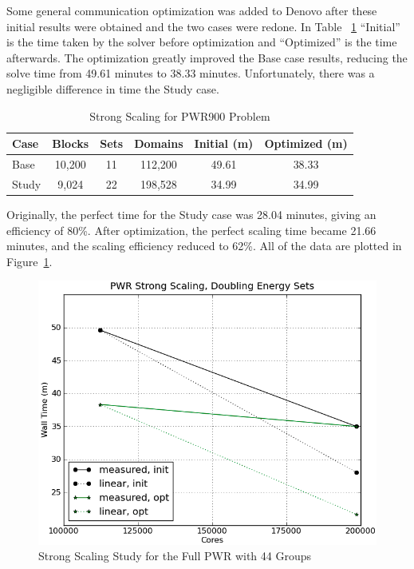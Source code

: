 Some general communication optimization was added to Denovo after these initial results were obtained and the two cases were redone. In Table ~\ref{table:StrongCasesPWR} ``Initial'' is the time taken by the solver before optimization and ``Optimized'' is the time afterwards. The optimization greatly improved the Base case results, reducing the solve time from 49.61 minutes to 38.33 minutes. Unfortunately, there was a negligible difference in time the Study case. 
%
\begin{table}[!h]
\caption{Strong Scaling for PWR900 Problem}
\begin{center}
\begin{tabular}{l c c c c c}
\hline
Case & Blocks & Sets & Domains & Initial (m) & Optimized (m) \\[0.5ex]
\hline
Base   & 10,200 & 11 & 112,200 & 49.61 & 38.33 \\
Study & 9,024    & 22 & 198,528 & 34.99 & 34.99 \\
\hline
\end{tabular}
\end{center}
\label{table:StrongCasesPWR}
\end{table}
%
Originally, the perfect time for the Study case was 28.04 minutes, giving an efficiency of 80\%. After optimization, the perfect scaling time became 21.66 minutes, and the scaling efficiency reduced to 62\%. All of the data are plotted in Figure~\ref{fig:PWRstrongScaling}. 
\begin{figure}[!h]
  \begin{center}
    \includegraphics [width=.7\textwidth, height=.45\textheight ] {PWRstrongScaling}
  \end{center}
  \caption{Strong Scaling Study for the Full PWR with 44 Groups}
  \label{fig:PWRstrongScaling}
\end{figure}

